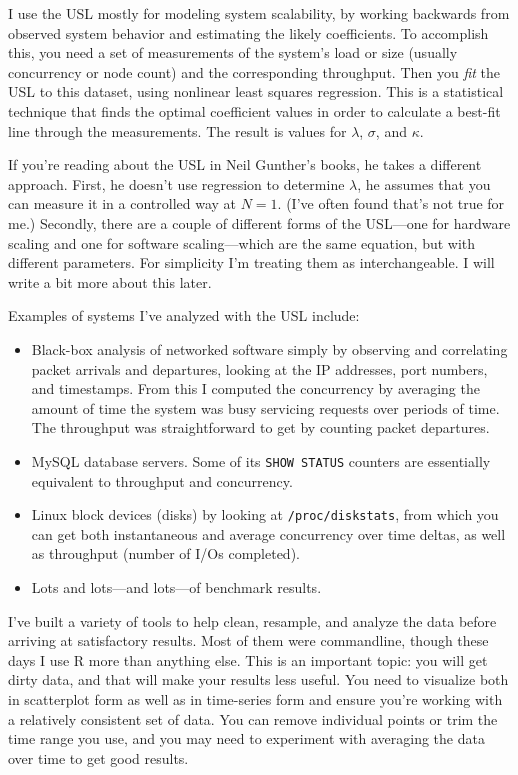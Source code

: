 \documentclass{vivid_layout}
\begin{document}
I use the USL mostly for modeling system scalability, by working backwards from
observed system behavior and estimating the likely coefficients. To accomplish
this, you need a set of measurements of the system's load or size (usually
concurrency or node count) and the corresponding throughput. Then you {\itshape
fit} the USL to this dataset, using nonlinear least squares regression. This is
a statistical technique that finds the optimal coefficient values in order to
calculate a best-fit line through the measurements. The result is values for
$\lambda$, $\sigma$, and $\kappa$.

If you're reading about the USL in Neil Gunther's books, he takes a different
approach. First, he doesn't use regression to determine $\lambda$, he assumes
that you can measure it in a controlled way at $N=1$. (I've often found that's
not true for me.) Secondly, there are a couple of different forms of the
USL---one for hardware scaling and one for software scaling---which are the same
equation, but with different parameters. For simplicity I'm treating them as
interchangeable. I will write a bit more about this later.

Examples of systems I've analyzed with the USL include:

\begin{itemize}
\item Black-box analysis of networked software simply by observing and
correlating packet arrivals and departures, looking at the IP addresses, port
numbers, and timestamps. From this I computed the concurrency by averaging the
amount of time the system was busy servicing requests over periods of time. The
throughput was straightforward to get by counting packet departures.
\item MySQL database servers. Some of its \texttt{SHOW STATUS} counters are
essentially equivalent to throughput and concurrency.
\item Linux block devices (disks) by looking at \texttt{/proc/diskstats}, from
which you can get both instantaneous and average concurrency over time deltas,
as well as throughput (number of I/Os completed).
\item Lots and lots---and lots---of benchmark results.
\end{itemize}

I've built a variety of tools to help clean, resample, and analyze the data
before arriving at satisfactory results. Most of them were commandline, though
these days I use R more than anything else. This is an important topic:
you will get dirty data, and that will
make your results less useful. You need to visualize both in scatterplot form as
well as in time-series form and ensure you're working with a relatively
consistent set of data. You can remove individual points or trim the time range
you use, and you may need to experiment with averaging the data over time to get
good results.
\end{document}
